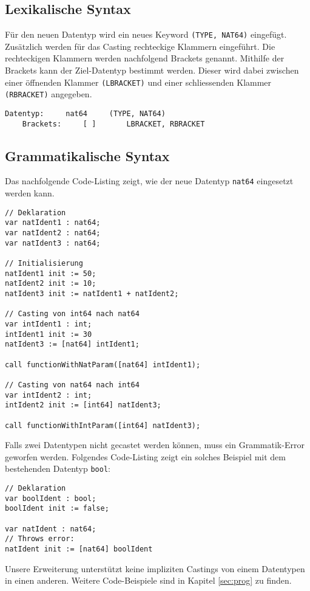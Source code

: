 \documentclass[10pt, a4paper, twocolumn]{article} %
\begin{document}
\subsection{Lexikalische Syntax}
Für den neuen Datentyp wird ein neues Keyword \texttt{(TYPE, NAT64)} eingefügt.
Zusätzlich werden für das Casting rechteckige Klammern eingeführt.
Die rechteckigen Klammern werden nachfolgend Brackets genannt.
Mithilfe der Brackets kann der Ziel-Datentyp bestimmt werden.
Dieser wird dabei zwischen einer öffnenden Klammer \texttt{(LBRACKET)} und einer schliessenden Klammer \texttt{(RBRACKET)} angegeben.
\begin{lstlisting}[backgroundcolor = \color{lightgray},
xleftmargin = 0.05cm,
framexleftmargin = 0.05em]
    Datentyp:     nat64     (TYPE, NAT64)
    Brackets:     [ ]       LBRACKET, RBRACKET
\end{lstlisting}

\subsection{Grammatikalische Syntax}
Das nachfolgende Code-Listing zeigt, wie der neue Datentyp \texttt{nat64} eingesetzt werden kann.
\begin{lstlisting}
// Deklaration
var natIdent1 : nat64;
var natIdent2 : nat64;
var natIdent3 : nat64;

// Initialisierung
natIdent1 init := 50;
natIdent2 init := 10;
natIdent3 init := natIdent1 + natIdent2;

// Casting von int64 nach nat64
var intIdent1 : int;
intIdent1 init := 30
natIdent3 := [nat64] intIdent1;

call functionWithNatParam([nat64] intIdent1);

// Casting von nat64 nach int64
var intIdent2 : int;
intIdent2 init := [int64] natIdent3;

call functionWithIntParam([int64] natIdent3);
\end{lstlisting}
Falls zwei Datentypen nicht gecastet werden können, muss ein Grammatik-Error geworfen werden.
Folgendes Code-Listing zeigt ein solches Beispiel mit dem bestehenden Datentyp \texttt{bool}:
\begin{lstlisting}
// Deklaration
var boolIdent : bool;
boolIdent init := false;

var natIdent : nat64;
// Throws error:
natIdent init := [nat64] boolIdent
\end{lstlisting}
Unsere Erweiterung unterstützt keine impliziten Castings von einem Datentypen in einen anderen.
Weitere Code-Beispiele sind in Kapitel \ref{sec:prog} zu finden.
\end{document}
